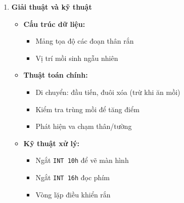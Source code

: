 \begin{enumerate}[leftmargin=*, label=\textbf{\arabic*.}, itemsep=1em]
    \item \textbf{Giải thuật và kỹ thuật}
    
    \begin{itemize}[leftmargin=1.5em, label=$\bullet$]
        \item \textbf{Cấu trúc dữ liệu:}
        \begin{itemize}[leftmargin=1.5em, label=$\circ$]
            \item Mảng tọa độ các đoạn thân rắn
            \item Vị trí mồi sinh ngẫu nhiên
        \end{itemize}
        
        \item \textbf{Thuật toán chính:}
        \begin{itemize}[leftmargin=1.5em, label=$\circ$]
            \item Di chuyển: đầu tiến, đuôi xóa (trừ khi ăn mồi)
            \item Kiểm tra trùng mồi để tăng điểm
            \item Phát hiện va chạm thân/tường
        \end{itemize}
        
        \item \textbf{Kỹ thuật xử lý:}
        \begin{itemize}[leftmargin=1.5em, label=$\circ$]
            \item Ngắt \texttt{INT 10h} để vẽ màn hình
            \item Ngắt \texttt{INT 16h} đọc phím
            \item Vòng lặp điều khiển rắn 
        \end{itemize}
    \end{itemize}
\end{enumerate}